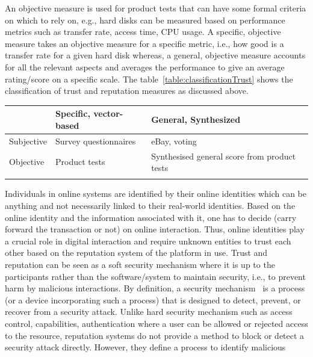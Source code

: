 An objective measure is used for product tests that can have some formal
criteria on which to rely on, e.g., hard disks can be measured based on
performance metrics such as transfer rate, access time, CPU usage. A specific,
objective measure takes an objective measure for a specific metric, i.e., how
good is a transfer rate for a given hard disk whereas, a general, objective
measure accounts for all the relevant aspects and averages the performance to
give an average rating/score on a specific scale. The
table~\ref{table:classificationTrust} shows the classification of trust and
reputation measures as discussed above.  
 \begin{center}\label{table:classificationTrust}
	\begin{tabularx}{\textwidth }{|X| X| X| }
		\hline
		 & Specific, vector-based & General, Synthesized \\
		 \hline
		Subjective & Survey questionnaires & eBay, voting \\
		\hline
		Objective & Product tests & Synthesised general score from product tests \\
		\hline
		\caption{Classification of trust and reputation measures based on ~\cite{josang2007survey}} 
	\end{tabularx}
\end{center}
\vspace{-15mm}
Individuals in online systems are identified by their online identities which
can be anything and not necessarily linked to their real-world identities.
Based on the online identity and the information associated with it, one has to
decide (carry forward the transaction or not) on online interaction. Thus,
online identities play a crucial role in digital interaction and require
unknown entities to trust each other based on the reputation system of the
platform in use. Trust and reputation can be seen as a soft security mechanism
where it is up to the participants rather than the software/system to maintain
security, i.e., to prevent harm by malicious interactions. By definition, a
security mechanism~\cite{stallings2017cryptography} is a process (or a device
incorporating such a process) that is designed to detect, prevent, or recover
from a security attack. Unlike hard security mechanism such as access control,
capabilities, authentication where a user can be allowed or rejected access to
the resource, reputation systems do not provide a method to block or detect a
security attack directly. However, they define a process to identify malicious
